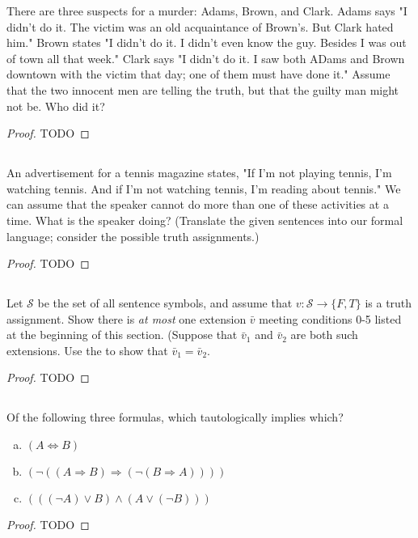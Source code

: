 \documentclass{report}
\begin{document}
  There are three suspects for a murder: Adams, Brown, and Clark.
  Adams says "I didn't do it. The victim was an old acquaintance of Brown's.
    But Clark hated him."
  Brown states "I didn't do it. I didn't even know the guy. Besides I was out of
    town all that week."
  Clark says "I didn't do it. I saw both ADams and Brown downtown with the
    victim that day; one of them must have done it."
  Assume that the two innocent men are telling the truth, but that the guilty
    man might not be.
  Who did it?

  \begin{proof}
    TODO
  \end{proof}

\subsection{}%

  An advertisement for a tennis magazine states, "If I'm not playing tennis,
    I'm watching tennis. And if I'm not watching tennis, I'm reading about
    tennis."
  We can assume that the speaker cannot do more than one of these activities at
    a time.
  What is the speaker doing?
  (Translate the given sentences into our formal language; consider the possible
    truth assignments.)

  \begin{proof}
    TODO
  \end{proof}

\subsection{}%

  Let $\mathcal{S}$ be the set of all sentence symbols, and assume that
    $v \colon \mathcal{S} \rightarrow \{F, T\}$ is a truth assignment.
  Show there is \textit{at most} one extension $\bar{v}$ meeting conditions 0-5
    listed at the beginning of this section.
  (Suppose that $\bar{v}_1$ and $\bar{v}_2$ are both such extensions. Use the
     to show that $\bar{v}_1 = \bar{v}_2$.

  \begin{proof}
    TODO
  \end{proof}

\subsection{}%

  Of the following three formulas, which tautologically implies which?
    \begin{enumerate}[(a)]
      \item $(A \Leftrightarrow B)$
      \item $(\neg((A \Rightarrow B) \Rightarrow (\neg(B \Rightarrow A))))$
      \item $(((\neg A) \lor B) \land (A \lor (\neg B)))$
    \end{enumerate}

  \begin{proof}
    TODO
  \end{proof}
\end{document}
